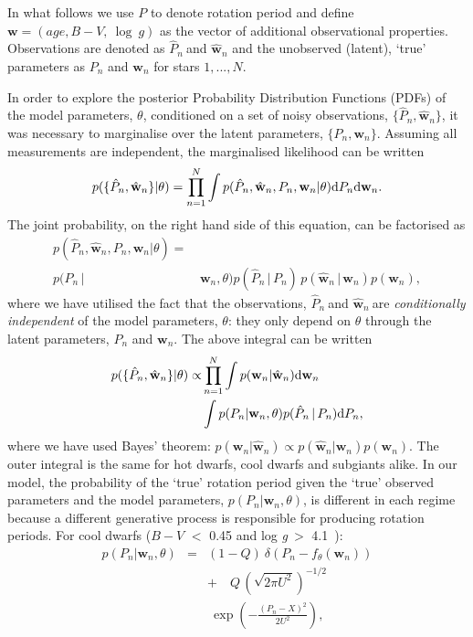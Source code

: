 \documentclass[useAMS, usenatbib]{mn2e}
\newcommand{\logg}{log \emph{g}}
\newcommand{\w}{\mathbf{w}}
\newcommand{\wh}{$\hat{\mathbf{w}}_n$}
\newcommand{\ph}{$\hat{P}_n$}
\newcommand{\subcut}{4.1~}
\begin{document}
In what follows we use $P$ to denote rotation period and define
$\mathbf{w} = (age, B-V,~\log~g)$ as the vector of additional observational
properties.
Observations are denoted as \ph$~$and $\hat{\mathbf{w}}_n$ and the unobserved
(latent), `true' parameters as $P_n$ and $\mathbf{w}_n$ for stars $1,...,N$.

In order to explore the posterior Probability Distribution Functions (PDFs) of
the model parameters, $\theta$, conditioned on a set of noisy observations,
$\{\hat{P}_n, \hat{\mathbf{w}}_n\}$, it was necessary to marginalise over the
latent parameters, $\{P_n, \mathbf{w}_n\}$.
Assuming all measurements are independent, the marginalised likelihood can be
written
\begin{equation}
	p(\{\hat{P}_n,\hat{\w}_n\}|\theta) =
	\prod_{n=1}^{N} \int p(\hat{P}_n,\hat{\w}_n,P_n,\w_n|\theta)
	{\rm d}P_n {\rm d}\w_n.
\label{eq:fulll}
\end{equation}
The joint probability, on the right hand side of this equation, can be
factorised as
\begin{align}
	p(\hat{P}_n,\hat{\w}_n,P_n,\w_n|\theta) = & \\
	p(P_n\,| & \,\w_n,\theta)
	p(\hat{P}_n\,|\,P_n)\,p(\hat{\w}_n\,|\,\w_n)p(\w_n),
\nonumber
\end{align}
where we have utilised the fact that the observations, \ph$~$and \wh$~$are
{\it conditionally independent} of the model parameters, $\theta$: they only
depend on $\theta$ through the latent parameters, $P_n$ and $\w_n$.
The above integral can  be written
\begin{eqnarray}
	p(\{\hat{P}_n,\hat{\w}_n\}|\theta) \propto &
	\prod_{n=1}^{N} \int p(\w_n|\hat{\w}_n) {\rm d}\w_n \\ \nonumber
	& \int p(P_n|\w_n,\theta) p(\hat{P}_n\,|\,P_n) {\rm d}P_n,
\label{eq:fac}
\end{eqnarray}
where we have used Bayes' theorem:
$p(\w_n|\hat{\w}_n) \propto p(\hat{\w}_n|\w_n)p(\w_n)$.
The outer integral is the same for hot dwarfs, cool dwarfs and subgiants
alike.
In our model, the probability of the `true' rotation period given the `true'
observed parameters and the model parameters, $p(P_n|\w_n, \theta)$, is
different in each regime because a different generative process is responsible
for producing rotation periods.
For cool dwarfs ($B-V$ $<$ 0.45 and \logg$~>$ \subcut):
\begin{eqnarray} \label{eq:codw}
p(P_n|\w_n,\theta) &=&
    (1-Q)~\delta \left (P_n - f_\theta(\w_n)\right) \\ \nonumber
    && +\quad Q\,\left(\sqrt{2\pi U^2}\right)^{-1/2} \\ \nonumber
    &&	~\exp\left({-\frac{(P_n-X)^2}{2U^2}}\right),
\end{eqnarray}
\end{document}
